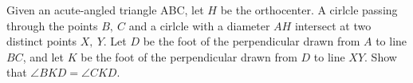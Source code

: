 Given an acute-angled triangle ABC, let $H$ be the orthocenter. A cirlcle passing through the points $B,\ C$ and a cirlcle with a diameter $AH$ intersect at two distinct points $X,\ Y$. Let $D$ be the foot of the perpendicular drawn from $A$ to line $BC$, and let $K$ be the foot of the perpendicular drawn from $D$ to line $XY$. Show that $\angle{BKD}=\angle{CKD}$.